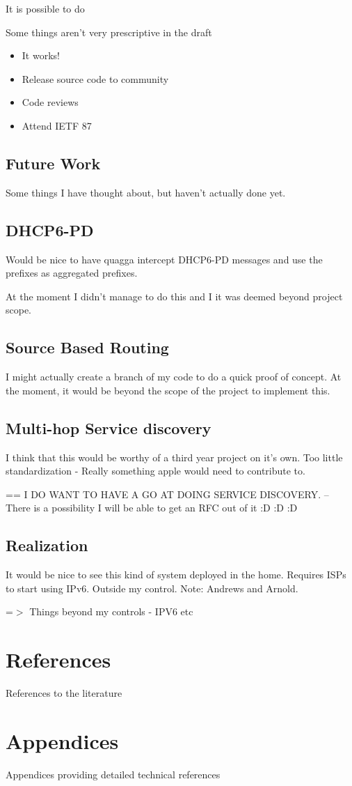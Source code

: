 \documentclass[12pt]{report}
\begin{document}
It is possible to do

Some things aren't very prescriptive in the draft

\begin{itemize}
\item It works! 
\item Release source code to community
\item Code reviews
\item Attend IETF 87
\end{itemize}

\section{Future Work}
Some things I have thought about, but haven't actually done yet.

\section{DHCP6-PD}
Would be nice to have quagga intercept DHCP6-PD messages and use the prefixes as aggregated prefixes. 

At the moment I didn't manage to do this and I it was deemed beyond project scope.

\section{Source Based Routing}
I might actually create a branch of my code to do a quick proof of concept. At the moment, 
it would be beyond the scope of the project to implement this. 

\section{Multi-hop Service discovery}
I think that this would be worthy of a third year project on it's own. 
Too little standardization - Really something apple would need to contribute to. 

== I DO WANT TO HAVE A GO AT DOING SERVICE DISCOVERY.
-- There is a possibility I will be able to get an RFC out of it :D :D :D

\section{Realization}
It would be nice to see this kind of system deployed in the home. 
Requires ISPs to start using IPv6.
Outside my control. 
Note: Andrews and Arnold.

=$>$ Things beyond my controls - IPV6 etc

\chapter{References}
References to the literature

\chapter{Appendices}
Appendices providing detailed technical references
\end{document}
